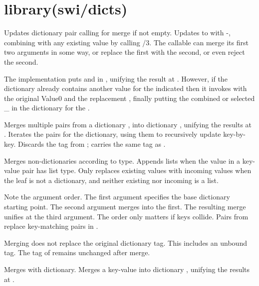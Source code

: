 \chapter{library(swi/dicts)}\label{sec:dicts}

\begin{description}
Updates dictionary pair calling for merge if not empty. Updates
 to  with -, combining  with any existing
value by calling /3. The callable can merge its first two
arguments in some way, or replace the first with the second, or even
reject the second.

The implementation puts  and  in , unifying the result
at . However, if the dictionary  already contains another
value for the indicated  then it invokes  with the
original Value0 and the replacement , finally putting the
combined or selected _ in the dictionary for the .

Merges multiple pairs from a dictionary , into dictionary
, unifying the results at . Iterates the pairs for the
 dictionary, using them to recursively update  key-by-key.
Discards the tag from ;  carries the same tag as .

Merges non-dictionaries according to type. Appends lists when the
value in a key-value pair has list type. Only replaces existing
values with incoming values when the leaf is not a dictionary, and
neither existing nor incoming is a list.

Note the argument order. The first argument specifies the base
dictionary starting point. The second argument merges into the
first. The resulting merge unifies at the third argument. The order
only matters if keys collide. Pairs from  replace key-matching
pairs in .

Merging does not replace the original dictionary tag. This includes
an unbound tag. The tag of  remains unchanged after merge.

Merges  with dictionary. Merges a key-value  into dictionary
, unifying the results at .


\end{description}
